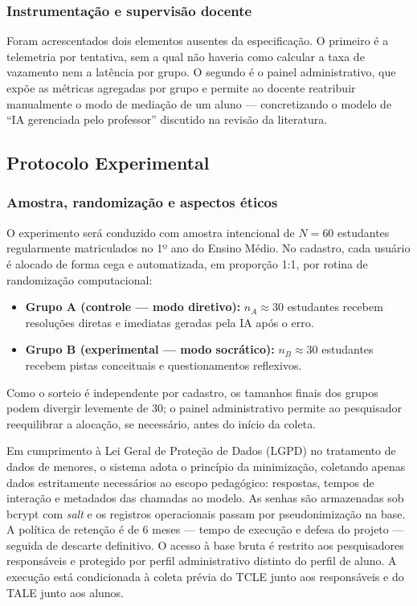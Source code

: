 \documentclass[10pt, a4paper, twocolumn]{article}
\begin{document}
\subsubsection{Instrumentação e supervisão docente}

Foram acrescentados dois elementos ausentes da especificação. O primeiro é a
telemetria por tentativa, sem a qual não haveria como calcular a taxa de
vazamento nem a latência por grupo. O segundo é o painel administrativo, que
expõe as métricas agregadas por grupo e permite ao docente reatribuir
manualmente o modo de mediação de um aluno --- concretizando o modelo de ``IA
gerenciada pelo professor'' discutido na revisão da literatura.

\subsection{Protocolo Experimental}
\label{subsec:experimento}

\subsubsection{Amostra, randomização e aspectos éticos}

O experimento será conduzido com amostra intencional de $N = 60$ estudantes
regularmente matriculados no 1º ano do Ensino Médio. No cadastro, cada usuário é
alocado de forma cega e automatizada, em proporção 1:1, por rotina de
randomização computacional:

\begin{itemize}[leftmargin=0.4cm, itemsep=2pt]
    \item \textbf{Grupo A (controle --- modo diretivo):} $n_A \approx 30$
    estudantes recebem resoluções diretas e imediatas geradas pela IA após o
    erro.
    \item \textbf{Grupo B (experimental --- modo socrático):} $n_B \approx 30$
    estudantes recebem pistas conceituais e questionamentos reflexivos.
\end{itemize}

Como o sorteio é independente por cadastro, os tamanhos finais dos grupos podem
divergir levemente de 30; o painel administrativo permite ao pesquisador
reequilibrar a alocação, se necessário, antes do início da coleta.

Em cumprimento à Lei Geral de Proteção de Dados (LGPD) no tratamento de dados de
menores, o sistema adota o princípio da minimização, coletando apenas dados
estritamente necessários ao escopo pedagógico: respostas, tempos de interação e
metadados das chamadas ao modelo. As senhas são armazenadas sob bcrypt com
\textit{salt} e os registros operacionais passam por pseudonimização na base. A
política de retenção é de 6 meses --- tempo de execução e defesa do projeto ---
seguida de descarte definitivo. O acesso à base bruta é restrito aos
pesquisadores responsáveis e protegido por perfil administrativo distinto do
perfil de aluno. A execução está condicionada à coleta prévia do TCLE junto aos
responsáveis e do TALE junto aos alunos.
\end{document}
